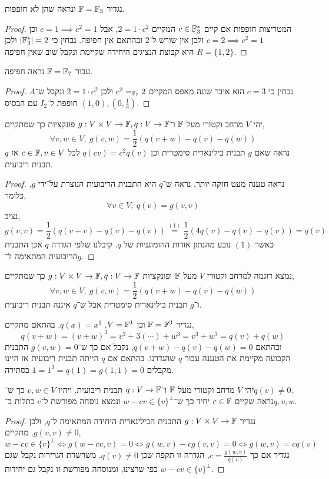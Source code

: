 \subquestion{}
נגדיר $\mathbb{F} = \mathbb{F}_3$ ונראה שהן לא חופפות.
\begin{proof}
	המטריצות חופפות אם קיים $c \in \mathbb{F}_3^*$ המקיים $2 = 1 \cdot c^2$, אבל $c = 1 \implies c^2 = 1$ וכן $c = 2 \implies c^2 = 1$ ולכן אין שורש ל־$2$ ובהתאם אין חפיפה.
	נבחין כי $|\mathbb{F}_3^*| = 2$ ולכן $R = \{1, 2\}$ היא קבוצת הנציגים היחידה שקיימת ונקבל שוב שאין חפיפה.
\end{proof}

\subquestion{}
עבור $\mathbb{F} = \mathbb{F}_7$ נראה חפיפה.
\begin{proof}
	נבחין כי $c = 3$ הוא איבר שונה מאפס המקיים $c^2 =_{\mathbb{F}_7} 2$ ולכן $2 = 1 \cdot c^2$ ונקבל ש־$A$ חופפת ל־$I_2$ עם הבסיס $(1, 0), (0, \frac{1}{3})$.
\end{proof}

\question{}
יהי $V$ מרחב וקטורי מעל $\mathbb{F}$ ו־$g : V \times V \to \mathbb{F}, q : V \to \mathbb{F}$ פונקציות כך שמתקיים,
\[
	\forall v, w \in V,\ 
	g(v, w)
	= \frac{1}{2} (q(v + w) - q(v) - q(w))
\]
נראה שאם $g$ תבנית בילינארית סימטרית וכן $q(c v) = c^2 q(v)$ לכל $c \in \mathbb{F}, v \in V$ אז $q$ תבנית ריבועית.
\begin{proof}
	נראה טענה מעט חזקה יותר, נראה ש־$q$ היא התבנית הריבועית הנוצרת על־ידי $g$, כלומר,
	\[
		\forall v \in V,\ 
		q(v) = g(v, v)
	\]
	נציב,
	\[
		g(v, v)
		= \frac{1}{2}( q(v + v) - q(v) - q(v))
		\overset{(1)}{=}  \frac{1}{2} (4q(v) - q(v) - q(v))
		= q(v)
	\]
	כאשר $(1)$ נובע מהנתון אודות ההומוגניות של $q$.
	קיבלנו שלפי הגדרה $q$ אכן התבנית הריבועית המתאימה ל־$g$.
\end{proof}

\question{}
נמצא דוגמה למרחב וקטורי $V$ מעל $\mathbb{F}$ ופונקציות $g : V \times V \to \mathbb{F}, q : V \to \mathbb{F}$ כך שמתקיים,
\[
	\forall v, w \in V,\ 
	g(v, w)
	= \frac{1}{2} (q(v + w) - q(v) - q(w))
\]
ו־$g$ תבנית בילינארית סימטרית אבל ש־$q$ איננה תבנית ריבועית.
\begin{solution}
	נגדיר $\mathbb{F} = \mathbb{F}^3$ וכן $V = \mathbb{F}^1$, $q(x) = x^3$.
	בהתאם מתקיים,
	\[
		q(v + w)
		= {(v + w)}^3
		= v^3 + 3 (\cdots) + w^3
		= v^3 + w^3
		= q(v) + q(w)
	\]
	ובהתאם $q(v + w) - q(v) - q(w) = 0$, נקבל אם כך ש־$g(v, w) = 0$ התבנית הקבועה מקיימת את הטענה עבור $q$ שהגדרנו.
	בהתאם אם $q$ הייתה תבנית ריבועית אז היינו מקבלים $1 = 1^3 = q(1) = g(1, 1) = 0$ בסתירה.
\end{solution}

\question{}
יהי $V$ מרחב וקטורי מעל $\mathbb{F}$ ו־$q : V \to \mathbb{F}$ תבנית ריבועית, ויהיו $v, w \in V$ כך ש־$q(v) \ne 0$. \\
נראה שקיים $c \in \mathbb{F}$ יחיד כך ש־$w - c v \in {\{ v \}}^{\perp}$ ונמצא נוסחה מפורשת ל־$c$ כתלות ב־$q, v, w$.
\begin{proof}
	נגדיר $g : V \times V \to \mathbb{F}$ התבנית הבילינארית היחידה המתאימה ל־$q$, ולכן $g(v, v) \ne 0$.
	מתקיים,
	\[
		w - cv \in {\{ v \}}^\perp
		\iff g(w - cv, v) = 0
		\iff g(w, v) - c g(v, v) = 0
		\iff g(w, v) = c q(v)
	\]
	נגדיר אם כך $c = \frac{g(w, v)}{q(v)}$, הגדרה זו תקפה שכן $q(v) \ne 0$.
	משרשרת הגרירות נקבל שגם $w - c v \in {\{ v \}}^\perp$ כפי שרצינו, ומנוסחה מפורשת זו נקבל גם יחידות.
\end{proof}

